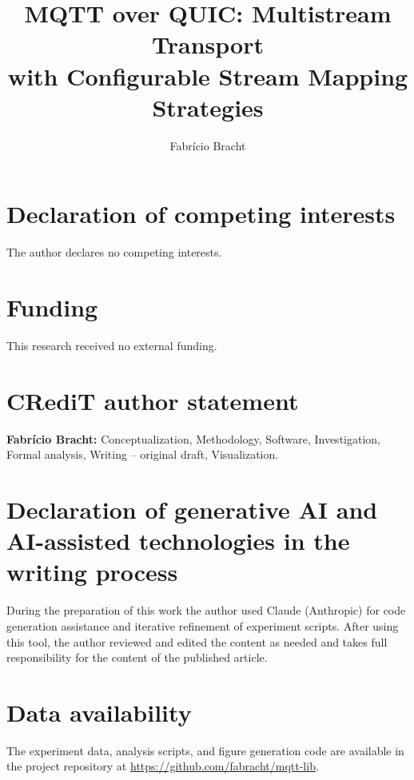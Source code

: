 \documentclass[3p,number]{elsarticle}
\begin{document}
\begin{frontmatter}

\title{MQTT over QUIC: Multistream Transport\\with Configurable Stream Mapping Strategies}

\author[lab]{Fabr\'{i}cio Bracht}



\end{frontmatter}









\section*{Declaration of competing interests}
The author declares no competing interests.

\section*{Funding}
This research received no external funding.

\section*{CRediT author statement}
\textbf{Fabr\'{i}cio Bracht:} Conceptualization, Methodology, Software, Investigation, Formal analysis, Writing -- original draft, Visualization.

\section*{Declaration of generative AI and AI-assisted technologies in the writing process}
During the preparation of this work the author used Claude (Anthropic) for code generation assistance and iterative refinement of experiment scripts. After using this tool, the author reviewed and edited the content as needed and takes full responsibility for the content of the published article.

\section*{Data availability}
The experiment data, analysis scripts, and figure generation code are available
in the project repository at \url{https://github.com/fabracht/mqtt-lib}.



\end{document}
